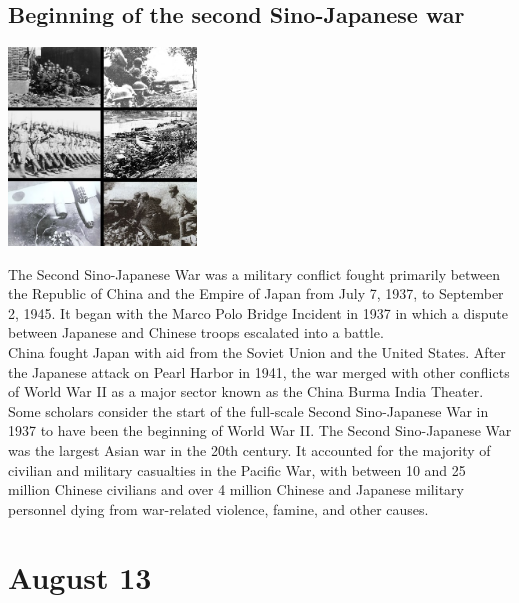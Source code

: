 \documentclass[11pt]{report}
\begin{document}
\subsection{Beginning of the second Sino-Japanese war}
\vspace{2mm}\begin{center}\includegraphics[width=5cm]{./img/2ndSinoJapWar.jpg}\end{center}
The Second Sino-Japanese War was a military conflict fought primarily between the Republic of China and the Empire of Japan from July 7, 1937, to September 2, 1945. It began with the Marco Polo Bridge Incident in 1937 in which a dispute between Japanese and Chinese troops escalated into a battle.\\
\indent China fought Japan with aid from the Soviet Union and the United States. After the Japanese attack on Pearl Harbor in 1941, the war merged with other conflicts of World War II as a major sector known as the China Burma India Theater. Some scholars consider the start of the full-scale Second Sino-Japanese War in 1937 to have been the beginning of World War II. The Second Sino-Japanese War was the largest Asian war in the 20th century. It accounted for the majority of civilian and military casualties in the Pacific War, with between 10 and 25 million Chinese civilians and over 4 million Chinese and Japanese military personnel dying from war-related violence, famine, and other causes.
\section{August 13}
\end{document}
